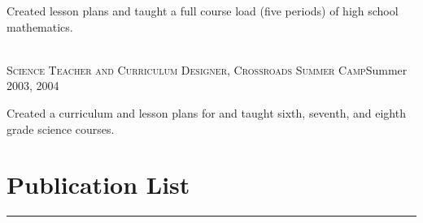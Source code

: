 \documentclass[10pt]{cv}
\begin{document}
\begin{llist}
\begin{minipage}[l]{0.7\textwidth}
Created lesson plans and taught a full course load (five periods) of high school mathematics.\\
\end{minipage}\vspace{0.15cm}
\\
\textsc{Science Teacher and Curriculum Designer, Crossroads Summer Camp}\hfill Summer 2003, 2004 \\
\begin{minipage}[l]{0.7\textwidth}\vspace{0.15cm}
Created a curriculum and lesson plans for and taught sixth, seventh, and eighth grade science courses.
\end{minipage}\vspace{0.15cm}
\end{llist}
\newpage
\section{{\LARGE \bf{Publication List}}}
{\rule{\linewidth}{0.5mm}} \\
\begin{llist}



%
\end{llist}
\end{document}
